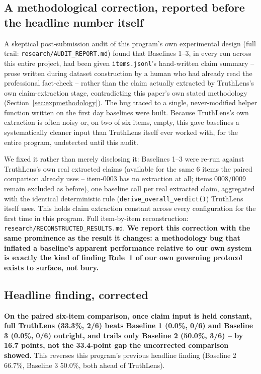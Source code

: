 \documentclass[conference]{IEEEtran}
\begin{document}
\subsection{A methodological correction, reported before the headline
number itself}
\label{sec:baselinefix}
A skeptical post-submission audit of this program's own experimental
design (full trail: \texttt{research/AUDIT\_REPORT.md}) found that
Baselines 1--3, in every run across this entire project, had been given
\texttt{items.jsonl}'s hand-written claim summary -- prose written during
dataset construction by a human who had already read the professional
fact-check -- rather than the claim actually extracted by TruthLens's own
claim-extraction stage, contradicting this paper's own stated methodology
(Section~\ref{sec:expmethodology}). The bug traced to a single,
never-modified helper function written on the first day baselines were
built. Because TruthLens's own extraction is often noisy or, on two of
six items, empty, this gave baselines a systematically cleaner input than
TruthLens itself ever worked with, for the entire program, undetected
until this audit.

We fixed it rather than merely disclosing it: Baselines 1--3 were re-run
against TruthLens's own real extracted claims (available for the same 6
items the paired comparison already uses -- item-0003 has no extraction
at all; items 0008/0009 remain excluded as before), one baseline call per
real extracted claim, aggregated with the identical deterministic rule
(\texttt{derive\_overall\_verdict()}) TruthLens itself uses. This holds
claim extraction constant across every configuration for the first time
in this program. Full item-by-item reconstruction:
\texttt{research/RECONSTRUCTED\_RESULTS.md}. \textbf{We report this
correction with the same prominence as the result it changes: a
methodology bug that inflated a baseline's apparent performance relative
to our own system is exactly the kind of finding Rule~1 of our own
governing protocol exists to surface, not bury.}

\subsection{Headline finding, corrected}
\textbf{On the paired six-item comparison, once claim input is held
constant, full TruthLens (33.3\%, 2/6) beats Baseline 1 (0.0\%, 0/6) and
Baseline 3 (0.0\%, 0/6) outright, and trails only Baseline 2
(50.0\%, 3/6) -- by 16.7 points, not the 33.4-point gap the uncorrected
comparison showed.} This reverses this program's previous headline
finding (Baseline 2 66.7\%, Baseline 3 50.0\%, both ahead of TruthLens).
\end{document}
